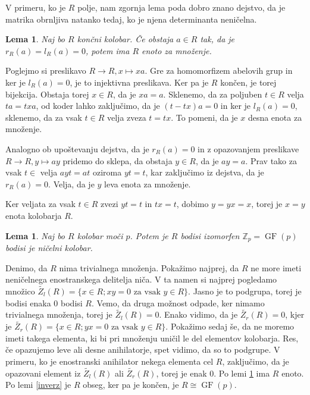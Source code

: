 \documentclass[a4paper, 12pt]{amsart}
\theoremstyle{definition} %
\theoremstyle{plain} %
\newtheorem{lema}[definicija]{Lema}
\newcommand{\Z}{\mathbb Z}
\DeclareMathOperator{\GF}{GF}
\begin{document}
V primeru, ko je $R$ polje, nam zgornja lema poda dobro znano dejstvo, da je matrika obrnljiva natanko tedaj, ko je njena determinanta neničelna.


\begin{lema}
\label{enota}
Naj bo $R$ končni kolobar. Če obstaja $a\in R$ tak, da je $r_R(a) = l_R(a) = 0$, potem ima $R$ enoto za množenje.
\end{lema}

\proof
Poglejmo si preslikavo $R \rightarrow R, x\mapsto xa$. Gre za homomorfizem abelovih grup in ker je $l_R(a) = 0$, je to injektivna preslikava. Ker pa je $R$ končen, je torej bijekcija. Obstaja torej $x \in R$, da je $xa = a$. Sklenemo, da za poljuben $t\in R$ velja $ta = txa$, od koder lahko zaključimo, da je $(t-tx)a = 0$ in ker je $l_R(a) = 0$, sklenemo, da  za vsak $t\in R$ velja zveza $t = tx$. To pomeni, da je $x$ desna enota za množenje.

Analogno ob upoštevanju dejstva, da je $r_R(a) = 0$ in z opazovanjem preslikave $R\rightarrow R, y \mapsto ay$ pridemo do sklepa, da obstaja $y \in R$, da je $ay=a$. Prav tako za vsak $t\in $ velja $ayt = at$ oziroma $yt=t$, kar zaključimo iz dejstva, da je $r_R(a) =0$. Velja, da je $y$ leva enota za množenje.

Ker veljata za vsak $t\in R$ zvezi $yt=t$ in $tx=t$, dobimo $y=yx=x$, torej je $x=y$ enota kolobarja $R$.
\endproof

\begin{lema}
\label{pkolobar}
Naj bo $R$ kolobar moči $p$. Potem je $R$ bodisi izomorfen $\Z_p = \GF(p)$ bodisi je ničelni kolobar.
\end{lema} 

\proof
Denimo, da $R$ nima trivialnega množenja. Pokažimo najprej, da $R$ ne more imeti neničelnega enostranskega delitelja niča. V ta namen si najprej pogledamo množico $\tilde{Z_l}(R) = \{x\in R; xy = 0 \text{ za vsak } y\in R\}$. Jasno je to podgrupa, torej je bodisi enaka 0 bodisi $R$. Vemo, da druga možnost odpade, ker nimamo trivialnega množenja, torej je $\tilde{Z_l}(R) = 0$. Enako vidimo, da je $\tilde{Z_r}(R) = 0$, kjer je $\tilde{Z_r}(R) = \{x\in R; yx = 0 \text{ za vsak } y\in R\}$. Pokažimo sedaj še, da ne moremo imeti takega elementa, ki bi pri množenju uničil le del elementov kolobarja. Res, če opazujemo leve ali desne anihilatorje, spet vidimo, da so to podgrupe. V primeru, ko je enostranski anihilator nekega elementa cel $R$, zaključimo, da je opazovani element iz $\tilde{Z_l}(R)$ ali $\tilde{Z_r}(R)$, torej je enak 0. Po lemi \ref{enota} ima $R$  enoto. Po lemi \ref{inverz} je $R$ obseg, ker pa je končen, je $R\cong \GF(p)$.
\endproof
\end{document}
